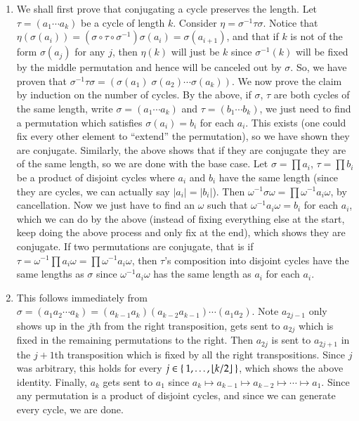 \documentclass[12pt]{article}
\theoremstyle{definitionstyle}
\newcommand{\floor}[1]{\left\lfloor#1\right\rfloor}
\begin{document}
\begin{enumerate}[leftmargin=\labelsep]
		\item We shall first prove that conjugating a cycle preserves the length. Let $\tau = (a_1 \cdots a_k)$ be a cycle of length $k$. Consider $\eta = \sigma^{-1} \tau \sigma$. Notice that $\eta(\sigma(a_i)) = (\sigma \circ \tau \circ \sigma^{-1})\sigma(a_{i}) = \sigma(a_{i+1})$, and that if $k$ is not of the form $\sigma(a_j)$ for any $j$, then $\eta(k)$ will just be $k$ since $\sigma^{-1}(k)$ will be fixed by the middle permutation and hence will be canceled out by $\sigma$. So, we have proven that $\sigma^{-1} \tau \sigma = (\sigma(a_1) \; \sigma(a_2) \cdots \sigma(a_k))$. We now prove the claim by induction on the number of cycles. By the above, if $\sigma$, $\tau$ are both cycles of the same length, write $\sigma = (a_1 \cdots a_k)$ and $\tau = (b_1 \cdots b_k)$, we just need to find a permutation which satisfies $\sigma(a_i) = b_i$ for each $a_i$. This exists (one could fix every other element to ``extend'' the permutation), so we have shown they are conjugate. Similarly, the above shows that if they are conjugate they are of the same length, so we are done with the base case. Let $\sigma = \prod a_i$, $\tau = \prod b_i$ be a product of disjoint cycles where $a_i$ and $b_i$ have the same length (since they are cycles, we can actually say $|a_i| = |b_i|$). Then $\omega^{-1} \sigma \omega = \prod \omega^{-1} a_i \omega$, by cancellation. Now we just have to find an $\omega$ such that $\omega^{-1} a_i \omega = b_i$ for each $a_i$, which we can do by the above (instead of fixing everything else at the start, keep doing the above process and only fix at the end), which shows they are conjugate. If two permutations are conjugate, that is if $\tau = \omega^{-1} \prod a_i \omega = \prod \omega^{-1} a_i \omega$, then $\tau$'s composition into disjoint cycles have the same lengths as $\sigma$ since $\omega^{-1} a_i \omega$ has the same length as $a_i$ for each $a_i$.
		
		\item This follows immediately from $\sigma = (a_1 a_2 \cdots a_k) = (a_{k-1} a_k) (a_{k-2} a_{k-1}) \cdots (a_1 a_2)$. Note $a_{2j-1}$ only shows up in the $j$th from the right transposition, gets sent to $a_{2j}$ which is fixed in the remaining permutations to the right. Then $a_{2j}$ is sent to $a_{2j+1}$ in the $j+1$th transposition which is fixed by all the right transpositions. Since $j$ was arbitrary, this holds for every $j \in \Set{1, \ldots, \floor{k/2}}$, which shows the above identity. Finally, $a_k$ gets sent to $a_1$ since $a_k \mapsto a_{k-1} \mapsto a_{k-2} \mapsto \cdots \mapsto a_1$. Since any permutation is a product of disjoint cycles, and since we can generate every cycle, we are done.
		

\end{enumerate}
\end{document}
